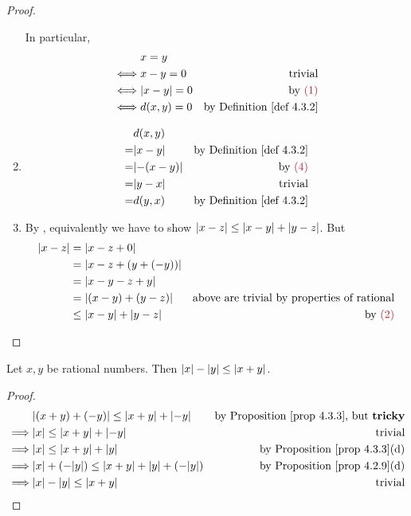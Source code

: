 \begin{proof}
\begin{enumerate}
        In particular,
        \begin{align*}
                 & x = y \\
            \iff & x - y = 0 & \text{trivial} \\
            \iff & \abs{x - y} = 0 & \text{by \MAROON{(1)}} \\
            \iff & d(x, y) = 0 & \text{by \DEF{4.3.2}}
        \end{align*}
    \item
        \begin{align*}
              & d(x, y) \\
            = & \abs{x - y} & \text{by \DEF{4.3.2}} \\
            = & \abs{-(x - y)} & \text{by \MAROON{(4)}} \\
            = & \abs{y - x} & \text{trivial} \\
            = & d(y, x) & \text{by \DEF{4.3.2}}
        \end{align*}
    \item
        By , equivalently we have to show \(\abs{x - z} \le \abs{x - y} + \abs{y - z}\).
        But
        \begin{align*}
            \abs{x - z} & = \abs{x - z + 0} \\
                        & = \abs{x - z + (y + (-y))} \\
                        & = \abs{x - y - z + y} \\
                        & = \abs{(x - y) + (y - z)} & \text{above are trivial by properties of rational} \\
                        & \le \abs{x - y} + \abs{y - z} & \text{by \MAROON{(2)}}
        \end{align*}
\end{enumerate}
\end{proof}

\begin{additional corollary}\label{ac 4.3.1}
Let \(x, y\) be rational numbers.
Then \(\abs{x} - \abs{y} \leq \abs*{x + y}\).
\end{additional corollary}

\begin{proof}
\begin{align*}
             & \abs{(x + y) + (-y)} \le \abs{x + y} + \abs{-y} & \text{by \PROP{4.3.3}, but \textbf{tricky}} \\
    \implies & \abs{x} \le \abs{x + y} + \abs{-y} & \text{trivial} \\
    \implies & \abs{x} \le \abs{x + y} + \abs{y} & \text{by \PROP{4.3.3}(d)} \\
    \implies & \abs{x} + (-\abs{y}) \le \abs{x + y} + \abs{y} + (-\abs{y}) & \text{by \PROP{4.2.9}(d)} \\
    \implies & \abs{x} - \abs{y} \le \abs{x + y} & \text{trivial}
\end{align*}
\end{proof}

